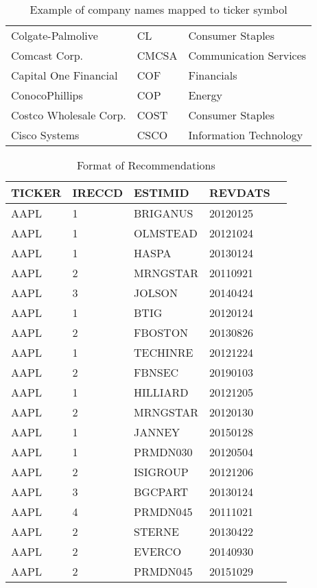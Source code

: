 \begin{table}[p]
\begin{tabular}{@{}lll@{}}
Colgate-Palmolive                 & CL    & Consumer Staples       \\
Comcast Corp.                     & CMCSA & Communication Services \\
Capital One Financial             & COF   & Financials             \\
ConocoPhillips                    & COP   & Energy                 \\
Costco Wholesale Corp.            & COST  & Consumer Staples       \\
Cisco Systems                     & CSCO  & Information Technology \\ \bottomrule
\end{tabular}
\caption{Example of company names mapped to ticker symbol}
\label{tab:industries}
\end{table}

\begin{table}[p]
\centering
\begin{tabular}{@{}lllll@{}}
\toprule\toprule
TICKER & IRECCD & ESTIMID    & REVDATS  \\ \midrule
AAPL   & 1      & BRIGANUS   & 20120125 \\
AAPL   & 1      & OLMSTEAD   & 20121024 \\
AAPL   & 1      & HASPA      & 20130124 \\
AAPL   & 2      & MRNGSTAR   & 20110921 \\
AAPL   & 3      & JOLSON     & 20140424 \\
AAPL   & 1      & BTIG       & 20120124 \\
AAPL   & 2      & FBOSTON    & 20130826 \\
AAPL   & 1      & TECHINRE   & 20121224 \\
AAPL   & 2      & FBNSEC     & 20190103 \\
AAPL   & 1      & HILLIARD   & 20121205 \\
AAPL   & 2      & MRNGSTAR   & 20120130 \\
AAPL   & 1      & JANNEY     & 20150128 \\
AAPL   & 1      & PRMDN030   & 20120504 \\
AAPL   & 2      & ISIGROUP   & 20121206 \\
AAPL   & 3      & BGCPART    & 20130124 \\
AAPL   & 4      & PRMDN045   & 20111021 \\
AAPL   & 2      & STERNE     & 20130422 \\
AAPL   & 2      & EVERCO     & 20140930 \\
AAPL   & 2      & PRMDN045   & 20151029 \\ \bottomrule
\end{tabular}
\caption{Format of Recommendations}
\label{tab:recommendations}
\end{table}
